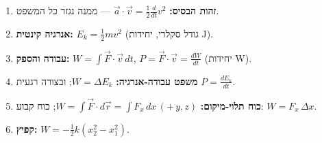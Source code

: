 \documentclass[12pt, a4paper]{article}
\newcommand{\hvec}[1]{\overrightarrow{#1}}
\begin{document}
\begin{tcolorbox}[warnbox, title={נקודות מפתח לזכור}]
\begin{enumerate}
  \item \textbf{זהות הבסיס:} \textenglish{$\hvec{a}\cdot\hvec{v} = \tfrac12\frac{d}{dt}v^2$} --- ממנה נגזר כל המשפט.
  \item \textbf{אנרגיה קינטית:} \textenglish{$E_k = \tfrac12 m v^2$} (גודל סקלרי, יחידות \textenglish{J}).
  \item \textbf{עבודה והספק:} \textenglish{$W = \int \hvec{F}\cdot\hvec{v}\,dt$}, \textenglish{$P = \hvec{F}\cdot\hvec{v} = \tfrac{dW}{dt}$} (יחידות \textenglish{W}).
  \item \textbf{משפט עבודה-אנרגיה:} \textenglish{$W = \Delta E_k$}; ובצורה רגעית \textenglish{$P = \tfrac{dE_k}{dt}$}.
  \item \textbf{כוח תלוי-מיקום:} \textenglish{$W = \int \hvec{F}\cdot d\hvec{r} = \int F_x\,dx\,(+\,y,z)$}; כוח קבוע: \textenglish{$W = F_x\,\Delta x$}.
  \item \textbf{קפיץ:} \textenglish{$W = -\tfrac12 k(x_2^2 - x_1^2)$}.
\end{enumerate}
\end{tcolorbox}
\end{document}
